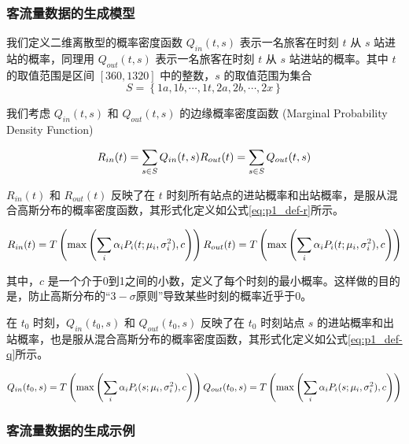 \documentclass[12pt,a4paper]{mcmthesis}
\begin{document}
\subsubsection{客流量数据的生成模型}

我们定义二维离散型的概率密度函数 $Q_{in}(t,s)$ 表示一名旅客在时刻 $t$ 从 $s$ 站进站的概率，同理用 $Q_{out}(t,s)$ 表示一名旅客在时刻 $t$ 从 $s$ 站进站的概率。其中 $t$ 的取值范围是区间 $[360,1320]$ 中的整数，$s$ 的取值范围为集合
\[ S = \left\{ 1a,1b,\cdots,1t,2a,2b,\cdots,2x \right\} \]

我们考虑 $Q_{in}(t,s)$ 和 $Q_{out}(t,s)$ 的边缘概率密度函数 (Marginal Probability Density Function)

\begin{equation*}
    R_{in}(t) = \sum_{s \in S} Q_{in}(t,s) \\
    R_{out}(t) = \sum_{s \in S} Q_{out}(t,s)
\end{equation*}

$R_{in}(t)$ 和 $R_{out}(t)$ 反映了在 $t$ 时刻所有站点的进站概率和出站概率，是服从混合高斯分布的概率密度函数，其形式化定义如公式\ref{eq:p1_def-r}所示。

\begin{equation}
    R_{in}(t) = T \left( \max \left( \sum_i \alpha_i P_i(t;\mu_i,\sigma^2_i), c \right) \right) \\
    R_{out}(t) = T \left( \max \left( \sum_i \alpha_i P_i(t;\mu_i,\sigma^2_i), c \right) \right)
    \label{eq:p1_def-r}
\end{equation}

其中，$c$ 是一个介于0到1之间的小数，定义了每个时刻的最小概率。这样做的目的是，防止高斯分布的“$3-\sigma$原则”导致某些时刻的概率近乎于0。

在 $t_0$ 时刻，$Q_{in}(t_0,s)$ 和 $Q_{out}(t_0,s)$ 反映了在 $t_0$ 时刻站点 $s$ 的进站概率和出站概率，也是服从混合高斯分布的概率密度函数，其形式化定义如公式\ref{eq:p1_def-q}所示。

\begin{equation}
    Q_{in}(t_0,s) = T \left( \max \left( \sum_i \alpha_i P_i(s;\mu_i,\sigma^2_i), c \right) \right) \\
    Q_{out}(t_0,s) = T \left( \max \left( \sum_i \alpha_i P_i(s;\mu_i,\sigma^2_i), c \right) \right)
    \label{eq:p1_def-q}
\end{equation}

\subsubsection{客流量数据的生成示例}
\end{document}
